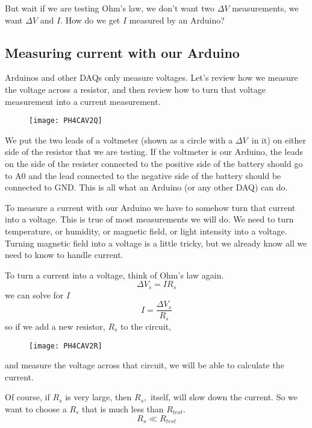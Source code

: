 But wait if we are testing Ohm's law, we don't want two $\Delta V$
measurements, we want $\Delta V$ and $I.$ How do we get $I$ measured by an
Arduino?

\subsection{Measuring current with our Arduino}

Arduinos and other DAQs only measure voltages. Let's review how we measure
the voltage across a resistor, and then review how to turn that voltage
measurement into a current measurement.

\begin{figure}[h!]
\texttt{[image: PH4CAV2Q]}
\end{figure}We put the two leads of a
voltmeter (shown as a circle with a $\Delta V$\ in it) on either side of the
resistor that we are testing. If the voltmeter is our Arduino, the leads on
the side of the resister connected to the positive side of the battery
should go to A0 and the lead connected to the negative side of the battery
should be connected to GND. This is all what an Arduino (or any other DAQ)
can do.

To measure a current with our Arduino we have to somehow turn that current
into a voltage. This is true of most measurements we will do. We need to
turn temperature, or humidity, or magnetic field, or light intensity into a
voltage. Turning magnetic field into a voltage is a little tricky, but we
already know all we need to know to handle current.

To turn a current into a voltage, think of Ohm's law again.%
\begin{equation*}
\Delta V_{s}=IR_{s}
\end{equation*}%
we can solve for $I$%
\begin{equation*}
I=\frac{\Delta V_{s}}{R_{s}}
\end{equation*}%
so if we add a new resistor, $R_{s}$ to the circuit, \begin{figure}[h!]
\texttt{[image: PH4CAV2R]}
\end{figure}and measure the voltage across
that circuit, we will be able to calculate the current.

Of course, if $R_{s}$ is very large, then $R_{s},$ itself, will slow down
the current. So we want to choose a $R_{s}$ that is much less than $%
R_{test}. $%
\begin{equation*}
R_{s}\ll R_{test}
\end{equation*}

